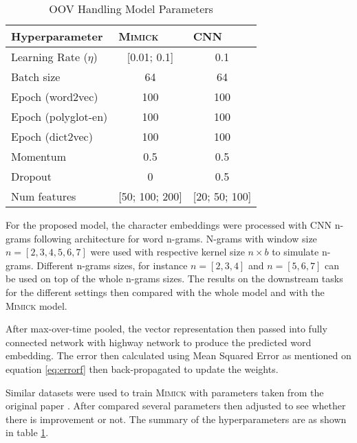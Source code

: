         \begin{table}[]
            \centering
            \caption{OOV Handling Model Parameters}
            \label{tab:hyperparameter}
            \begin{tabular}{@{}lcc@{}}
                \toprule
                \textbf{Hyperparameter} & \multicolumn{1}{l}{\textbf{\textsc{Mimick}}} & \multicolumn{1}{l}{\textbf{CNN}} \\ \midrule
                Learning Rate ($\eta$) & [0.01; 0.1] & 0.1 \\
                Batch size & 64 & 64 \\
                Epoch (word2vec) & 100 & 100 \\
                Epoch (polyglot-en) & 100 & 100 \\
                Epoch (dict2vec) & 100 & 100 \\
                Momentum & 0.5 & 0.5 \\
                Dropout & 0 & 0.5 \\
                Num features & [50; 100; 200] & [20; 50; 100] \\ \bottomrule
            \end{tabular}
        \end{table}

        For the proposed model, the character embeddings were
        processed with CNN n-grams following
        \cite{convolutional2014kim} architecture for word n-grams.
        N-grams with window size $n = [2, 3, 4, 5, 6, 7]$ were used
        with respective kernel size $n \times b$ to simulate n-grams.
        Different n-grams sizes, for instance $n = [2, 3, 4]$ and $n =
        [5, 6, 7]$ can be used on top of the whole n-grams sizes. The
        results on the downstream tasks for the different settings
        then compared with the whole model and with the
        \textsc{Mimick} model.
        
        After max-over-time pooled, the vector representation then
        passed into fully connected network with highway network to
        produce the predicted word embedding. The error then
        calculated using Mean Squared Error as mentioned on equation
        \ref{eq:errorf} then back-propagated to update the weights.

        Similar datasets were used to train \textsc{Mimick} with
        parameters taken from the original paper
        \citep{mimicking2017Pinter}. After compared several parameters
        then adjusted to see whether there is improvement or not. The
        summary of the hyperparameters are as shown in table
        \ref{tab:hyperparameter}.

